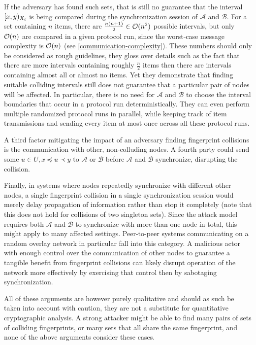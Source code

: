 If the adversary has found such sets, that is still no guarantee that the interval $[{x},{y})_{X_i}$ is being compared during the synchronization session of $\mathcal{A}$ and $\mathcal{B}$. For a set containing $n$ items, there are $\frac{n (n + 1)}{2} \in \mathcal{O}(n^2)$ possible intervals, but only $\mathcal{O}(n)$ are compared in a given protocol run, since the worst-case message complexity is $\mathcal{O}(n)$ (see \cref{communication-complexity}). These numbers should only be considered as rough guidelines, they gloss over details such as the fact that there are more intervals containing roughly $\frac{n}{2}$ items then there are intervals containing almost all or almost no items. Yet they demonstrate that finding suitable colliding intervals still does not guarantee that a particular pair of nodes will be affected. In particular, there is no need for $\mathcal{A}$ and $\mathcal{B}$ to choose the interval boundaries that occur in a protocol run deterministically. They can even perform multiple randomized protocol runs in parallel, while keeping track of item transmissions and sending every item at most once across all these protocol runs.

A third factor mitigating the impact of an adversary finding fingerprint collisions is the communication with other, non-colluding nodes. A fourth party could send some $u \in U, x \preceq u \prec y$ to $\mathcal{A}$ or $\mathcal{B}$ before $\mathcal{A}$ and $\mathcal{B}$ synchronize, disrupting the collision.

Finally, in systems where nodes repeatedly synchronize with different other nodes, a single fingerprint collision in a single synchronization session would merely delay propagation of information rather than stop it completely (note that this does not hold for collisions of two singleton sets). Since the attack model requires both $\mathcal{A}$ and $\mathcal{B}$ to synchronize with more than one node in total, this might apply to many affected settings. Peer-to-peer systems communicating on a random overlay network in particular fall into this category. A malicious actor with enough control over the communication of other nodes to guarantee a tangible benefit from fingerprint collisions can likely disrupt operation of the network more effectively by exercising that control then by sabotaging synchronization.

All of these arguments are however purely qualitative and should as such be taken into account with caution, they are not a substitute for quantitative cryptographic analysis. A strong attacker might be able to find many pairs of sets of colliding fingerprints, or many sets that all share the same fingerprint, and none of the above arguments consider these cases.

